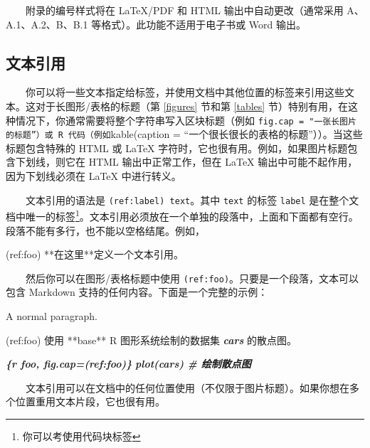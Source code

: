 \documentclass[
  12pt,
]{krantz}
\newenvironment{Shaded}{\begin{snugshade}}{\end{snugshade}}
\newcommand{\InformationTok}[1]{\textcolor[rgb]{0.56,0.35,0.01}{\textbf{\textit{#1}}}}
\newcommand{\NormalTok}[1]{#1}
\theoremstyle{definition}
\theoremstyle{definition}
\theoremstyle{definition}
\theoremstyle{definition}
\theoremstyle{remark}
\begin{document}
  附录的编号样式将在 LaTeX/PDF 和 HTML 输出中自动更改（通常采用 A、A.1、A.2、B、B.1 等格式）。此功能不适用于电子书或 Word 输出。

\hypertarget{text-references}{%
\subsection{文本引用}\label{text-references}}

  你可以将一些文本指定给标签，并使用文档中其他位置的标签来引用这些文本。这对于长图形/表格的标题（第 \ref{figures} 节和第 \ref{tables} 节）特别有用，在这种情况下，你通常需要将整个字符串写入区块标题（例如 \texttt{fig.cap\ =\ "一张长图片的标题”）或\ R\ 代码（例如}kable(caption = ``一个很长很长的表格的标题''））。当这些标题包含特殊的 HTML 或 LaTeX 字符时，它也很有用。例如，如果图片标题包含下划线，则它在 HTML 输出中正常工作，但在 LaTeX 输出中可能不起作用，因为下划线必须在 LaTeX 中进行转义。

  文本引用的语法是 \texttt{(ref:label)\ text}。其中 \texttt{text} 的标签 \texttt{label} 是在整个文档中唯一的标签\footnote{你可以考使用代码块标签}。文本引用必须放在一个单独的段落中，上面和下面都有空行。段落不能有多行，也不能以空格结尾。例如，

\begin{Shaded}
\begin{Highlighting}[]
\NormalTok{(ref:foo) **在这里**定义一个文本引用。}
\end{Highlighting}
\end{Shaded}

  然后你可以在图形/表格标题中使用 \texttt{(ref:foo)}。只要是一个段落，文本可以包含 Markdown 支持的任何内容。下面是一个完整的示例：

\begin{Shaded}
\begin{Highlighting}[]
\NormalTok{A normal paragraph.}

\NormalTok{(ref:foo) 使用 **base** R 图形系统绘制的数据集 }\InformationTok{\textasciigrave{}cars\textasciigrave{}}\NormalTok{ 的散点图。}

\InformationTok{\textasciigrave{}\textasciigrave{}\textasciigrave{}\{r foo, fig.cap=\textquotesingle{}(ref:foo)\textquotesingle{}\}}
\InformationTok{plot(cars)  \# 绘制散点图}
\InformationTok{\textasciigrave{}\textasciigrave{}\textasciigrave{}}
\end{Highlighting}
\end{Shaded}

  文本引用可以在文档中的任何位置使用（不仅限于图片标题）。如果你想在多个位置重用文本片段，它也很有用。
\end{document}
